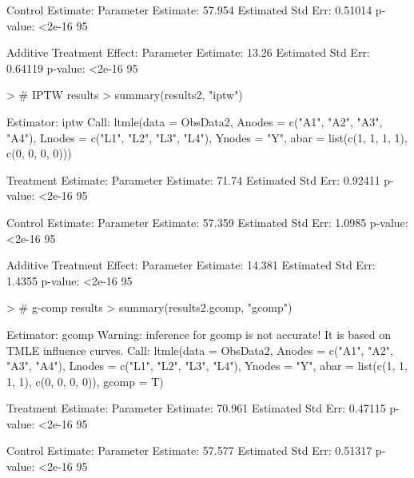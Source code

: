 \documentclass[answers]{exam}
\begin{document}
\begin{solution}
\begin{Schunk}
\begin{Soutput}
Control Estimate:
   Parameter Estimate:  57.954 
    Estimated Std Err:  0.51014 
              p-value:  <2e-16 
    95%

Additive Treatment Effect:
   Parameter Estimate:  13.26 
    Estimated Std Err:  0.64119 
              p-value:  <2e-16 
    95%
\end{Soutput}
\end{Schunk}
\begin{Schunk}
\begin{Sinput}
> # IPTW results
> summary(results2, "iptw")
\end{Sinput}
\begin{Soutput}
Estimator:  iptw 
Call:
ltmle(data = ObsData2, Anodes = c("A1", "A2", "A3", "A4"), Lnodes = c("L1", 
    "L2", "L3", "L4"), Ynodes = "Y", abar = list(c(1, 1, 1, 1), 
    c(0, 0, 0, 0)))

Treatment Estimate:
   Parameter Estimate:  71.74 
    Estimated Std Err:  0.92411 
              p-value:  <2e-16 
    95%

Control Estimate:
   Parameter Estimate:  57.359 
    Estimated Std Err:  1.0985 
              p-value:  <2e-16 
    95%

Additive Treatment Effect:
   Parameter Estimate:  14.381 
    Estimated Std Err:  1.4355 
              p-value:  <2e-16 
    95%
\end{Soutput}
\end{Schunk}
\begin{Schunk}
\begin{Sinput}
> # g-comp results
> summary(results2.gcomp, "gcomp")
\end{Sinput}
\begin{Soutput}
Estimator:  gcomp 
Warning: inference for gcomp is not accurate! It is based on TMLE influence curves.
Call:
ltmle(data = ObsData2, Anodes = c("A1", "A2", "A3", "A4"), Lnodes = c("L1", 
    "L2", "L3", "L4"), Ynodes = "Y", abar = list(c(1, 1, 1, 1), 
    c(0, 0, 0, 0)), gcomp = T)

Treatment Estimate:
   Parameter Estimate:  70.961 
    Estimated Std Err:  0.47115 
              p-value:  <2e-16 
    95%

Control Estimate:
   Parameter Estimate:  57.577 
    Estimated Std Err:  0.51317 
              p-value:  <2e-16 
    95%


\end{Soutput}
\end{Schunk}
\end{solution}
\end{document}
